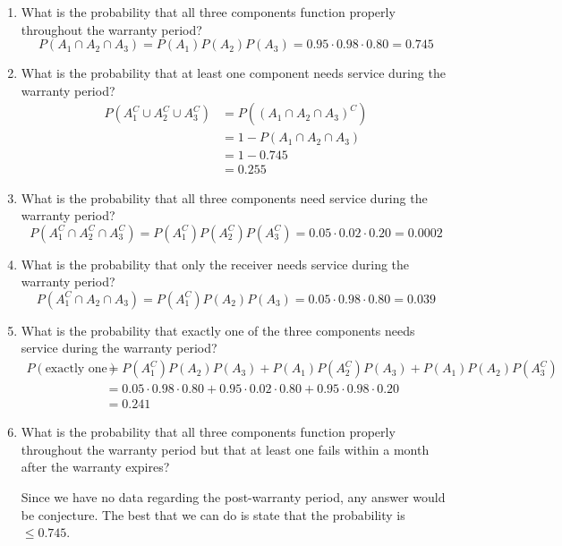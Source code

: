 \documentclass[letterpaper,12pt,fleqn]{article}
\begin{document}
\begin{enumerate}[label={\alph*)}]
\item What is the probability that all three components function properly throughout the warranty period?
  \[P(A_1\cap A_2\cap A_3)=P(A_1)P(A_2)P(A_3)=0.95\cdot0.98\cdot0.80=0.745\]

\item What is the probability that at least one component needs service during the warranty period?
  \begin{align*}
    P(A_1^C\cup A_2^C\cup A_3^C) &= P\left((A_1\cap A_2\cap A_3)^C\right) \\
    &= 1-P(A_1\cap A_2\cap A_3) \\
    &= 1-0.745 \\
    &= 0.255
  \end{align*}

\item What is the probability that all three components need service during the warranty period?
  \[P(A_1^C\cap A_2^C\cap A_3^C)=P(A_1^C)P(A_2^C)P(A_3^C)=0.05\cdot0.02\cdot0.20=0.0002\]

\item What is the probability that only the receiver needs service during the warranty period?
  \[P(A_1^C\cap A_2\cap A_3)=P(A_1^C)P(A_2)P(A_3)=0.05\cdot0.98\cdot0.80=0.039\]

\item What is the probability that exactly one of the three components needs service during the warranty period?
  \begin{align*}
    P(\text{exactly one}) &= P(A_1^C)P(A_2)P(A_3)+P(A_1)P(A_2^C)P(A_3)+P(A_1)P(A_2)P(A_3^C) \\
    &= 0.05\cdot0.98\cdot0.80+0.95\cdot0.02\cdot0.80+0.95\cdot0.98\cdot0.20 \\
    &= 0.241
  \end{align*}

\item What is the probability that all three components function properly throughout the warranty period but that at least
  one fails within a month after the warranty expires?

  Since we have no data regarding the post-warranty period, any answer would be conjecture.  The best that we can do is
  state that the probability is \(\le0.745\).
\end{enumerate}
\end{document}
